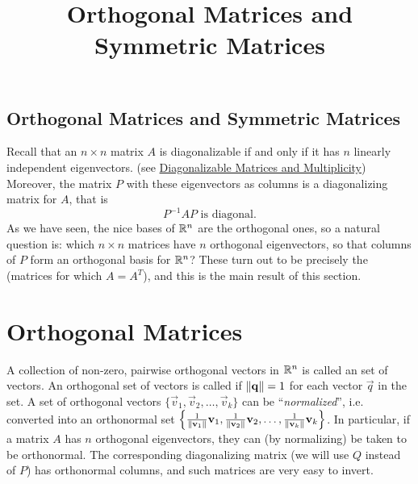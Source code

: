\documentclass{ximera}
\title{Orthogonal Matrices and Symmetric Matrices} \license{CC BY-NC-SA 4.0}
\begin{document}
\begin{abstract}

\end{abstract}
\maketitle

\begin{onlineOnly}
\section*{Orthogonal Matrices and Symmetric Matrices}
\end{onlineOnly}

Recall that an $n \times n$ matrix $A$ is diagonalizable if and only if it has $n$ linearly independent eigenvectors.  (see \href{https://ximera.osu.edu/linearalgebradzv3/LinearAlgebraInteractiveIntro/EIG-0050/main}{Diagonalizable Matrices and Multiplicity}) Moreover, the matrix $P$ with these eigenvectors as columns is a diagonalizing matrix for $A$, that is
\begin{equation*}
P^{-1}AP \mbox{ is diagonal.}
\end{equation*}
As we have seen, the nice bases of $\mathbb{R}^n$ are the orthogonal ones, so a natural question is: which $n \times n$ matrices have $n$ orthogonal eigenvectors, so that columns of $P$ form an orthogonal basis for $\mathbb{R}^n$? These turn out to be precisely the  (matrices for which $A=A^T$), and this is the main result of this section.

\section*{Orthogonal Matrices}
A collection of non-zero, pairwise orthogonal vectors in $\mathbb{R}^n$ is called an  set of vectors. An orthogonal set of vectors is called  if $\left\lVert\mathbf{q}\right\rVert = 1$ for each vector $\vec{q}$ in the set. A set of orthogonal vectors $\{\vec{v}_{1}, \vec{v}_{2}, \dots, \vec{v}_{k}\}$ can be ``\textit{normalized}'', i.e. converted into an orthonormal set $\left\{ \frac{1}{\left\lVert\mathbf{v}_{1}\right\rVert}\mathbf{v}_{1}, \frac{1}{\left\lVert\mathbf{v}_{2}\right\rVert}\mathbf{v}_{2}, \dots, \frac{1}{\left\lVert\mathbf{v}_{k}\right\rVert}\mathbf{v}_{k} \right\}$. In particular, if a matrix $A$ has $n$ orthogonal eigenvectors, they can (by normalizing) be taken to be orthonormal. The corresponding diagonalizing matrix (we will use $Q$ instead of $P$) has orthonormal columns, and such matrices are very easy to invert.
\end{document}
